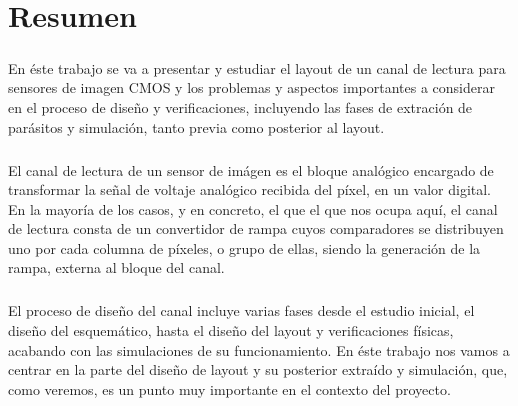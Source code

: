 \chapter*{Resumen}
\label{cap:resumen}

\paragraph{}
En éste trabajo se va a presentar y estudiar el layout de un canal de lectura
para sensores de imagen CMOS y los problemas y aspectos importantes a considerar
en el proceso de diseño y verificaciones, incluyendo las fases de extración de
parásitos y simulación, tanto previa como posterior al layout.

\paragraph{}
El canal de lectura de un sensor de imágen es el bloque analógico encargado de
transformar la señal de voltaje analógico recibida del píxel, en un valor digital.
En la mayoría de los casos, y en concreto, el que el que nos ocupa aquí, el canal de lectura
consta de un convertidor de rampa cuyos comparadores se distribuyen uno por cada
columna de píxeles, o grupo de ellas, siendo la generación de la rampa, externa
al bloque del canal.

\paragraph{}
El proceso de diseño del canal incluye varias fases desde el estudio inicial, el diseño
del esquemático, hasta el diseño del layout y verificaciones físicas, acabando con
las simulaciones de su funcionamiento. En éste trabajo nos vamos a centrar en la
parte del diseño de layout y su posterior extraído y simulación, que, como veremos,
es un punto muy importante en el contexto del proyecto.
